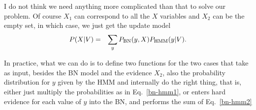 \documentclass{article}
\begin{document}
I do not think we need anything more complicated than that to solve our problem.
Of course $X_1$ can correspond to all the $X$ variables and $X_2$ can be the empty set, in which case, we just get the update model
\begin{eqnarray}
P(X| V) &=& \sum_y P_{\mbox{\scriptsize BN}}(y,X)P_{\mbox{\scriptsize HMM}}(y|V).
\end{eqnarray}

In practice, what we can do is to define two functions for the two cases that take as input, besides the BN model and the evidence $X_2$, also the probability distribution for $y$ given by the HMM and internally do the right thing, that is, either just multiply the probabilities as in Eq.~\ref{bn-hmm1}, or enters hard evidence for each value of $y$ into the BN, and performs the sum of Eq.~\ref{bn-hmm2}
\end{document}
